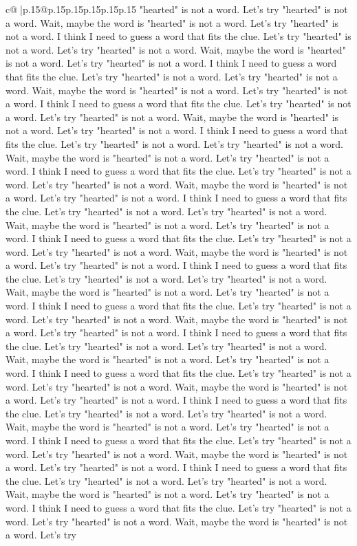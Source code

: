 \documentclass{article}
\begin{document}
{\begin{supertabular}{c@{$\;$}|p{.15\linewidth}@{}p{.15\linewidth}p{.15\linewidth}p{.15\linewidth}p{.15\linewidth}p{.15\linewidth}}
{{{"hearted" is not a word. Let's try "hearted" is not a word. Wait, maybe the word is "hearted" is not a word. Let's try "hearted" is not a word. I think I need to guess a word that fits the clue. Let's try "hearted" is not a word. Let's try "hearted" is not a word. Wait, maybe the word is "hearted" is not a word. Let's try "hearted" is not a word. I think I need to guess a word that fits the clue. Let's try "hearted" is not a word. Let's try "hearted" is not a word. Wait, maybe the word is "hearted" is not a word. Let's try "hearted" is not a word. I think I need to guess a word that fits the clue. Let's try "hearted" is not a word. Let's try "hearted" is not a word. Wait, maybe the word is "hearted" is not a word. Let's try "hearted" is not a word. I think I need to guess a word that fits the clue. Let's try "hearted" is not a word. Let's try "hearted" is not a word. Wait, maybe the word is "hearted" is not a word. Let's try "hearted" is not a word. I think I need to guess a word that fits the clue. Let's try "hearted" is not a word. Let's try "hearted" is not a word. Wait, maybe the word is "hearted" is not a word. Let's try "hearted" is not a word. I think I need to guess a word that fits the clue. Let's try "hearted" is not a word. Let's try "hearted" is not a word. Wait, maybe the word is "hearted" is not a word. Let's try "hearted" is not a word. I think I need to guess a word that fits the clue. Let's try "hearted" is not a word. Let's try "hearted" is not a word. Wait, maybe the word is "hearted" is not a word. Let's try "hearted" is not a word. I think I need to guess a word that fits the clue. Let's try "hearted" is not a word. Let's try "hearted" is not a word. Wait, maybe the word is "hearted" is not a word. Let's try "hearted" is not a word. I think I need to guess a word that fits the clue. Let's try "hearted" is not a word. Let's try "hearted" is not a word. Wait, maybe the word is "hearted" is not a word. Let's try "hearted" is not a word. I think I need to guess a word that fits the clue. Let's try "hearted" is not a word. Let's try "hearted" is not a word. Wait, maybe the word is "hearted" is not a word. Let's try "hearted" is not a word. I think I need to guess a word that fits the clue. Let's try "hearted" is not a word. Let's try "hearted" is not a word. Wait, maybe the word is "hearted" is not a word. Let's try "hearted" is not a word. I think I need to guess a word that fits the clue. Let's try "hearted" is not a word. Let's try "hearted" is not a word. Wait, maybe the word is "hearted" is not a word. Let's try "hearted" is not a word. I think I need to guess a word that fits the clue. Let's try "hearted" is not a word. Let's try "hearted" is not a word. Wait, maybe the word is "hearted" is not a word. Let's try "hearted" is not a word. I think I need to guess a word that fits the clue. Let's try "hearted" is not a word. Let's try "hearted" is not a word. Wait, maybe the word is "hearted" is not a word. Let's try "hearted" is not a word. I think I need to guess a word that fits the clue. Let's try "hearted" is not a word. Let's try "hearted" is not a word. Wait, maybe the word is "hearted" is not a word. Let's try }}}
\end{supertabular}}
\end{document}

